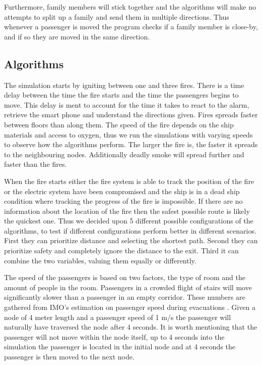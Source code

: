 Furthermore, family members will stick together and the algorithms will make no attempts to split up a family and send them in multiple directions. Thus whenever a passenger is moved the program checks if a family member is close-by, and if so they are moved in the same direction.

\subsection{Algorithms}
The simulation starts by igniting between one and three fires. There is a time delay between the time the fire starts and the time the passengers begins to move. This delay is ment to account for the time it takes to react to the alarm, retrieve the smart phone and understand the directions given. Fires spreads faster between floors than along them. The speed of the fire depends on the ship materials and access to oxygen, thus we run the simulations with varying speeds to observe how the algorithms perform. The larger the fire is, the faster it spreads to the neighbouring nodes. Additionally deadly smoke will spread further and faster than the fires. 

When the fire starts either the fire system is able to track the position of the fire or the electric system have been compromised and the ship is in a dead ship condition where tracking the progress of the fire is impossible. If there are no information about the location of the fire then the safest possible route is likely the quickest one. Thus we decided upon 5 different possible configurations of the algorithms, to test if different configurations perform better in different scenarios. First they can prioritize distance and selecting the shortest path. Second they can prioritize safety and completely ignore the distance to the exit. Third it can combine the two variables, valuing them equally or differently. 

The speed of the passengers is based on two factors, the type of room and the amount of people in the room. Passengers in a crowded flight of stairs will move significantly slower than a passenger in an empty corridor. These numbers are gathered from IMO's estimation on passenger speed during evacuations \cite{speed}. Given a node of 4 meter length and a passenger speed of 1 m/s the passenger will naturally have traversed the node after 4 seconds. It is worth mentioning that the passenger will not move within the node itself, up to 4 seconds into the simulation the passenger is located in the initial node and at 4 seconds the passenger is then moved to the next node.










